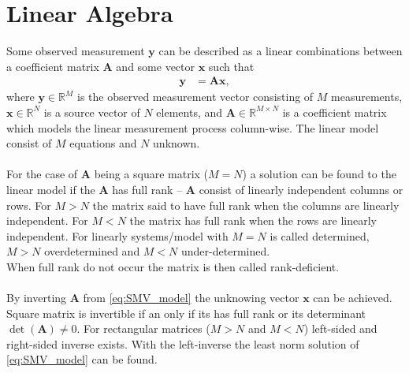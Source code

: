 \section{Linear Algebra}
Some observed measurement $\mathbf{y}$ can be described as a linear combinations between a coefficient matrix $\mathbf{A}$ and some vector $\mathbf{x}$ such that
\begin{align}\label{eq:SMV_model}
\mathbf{y} &= \mathbf{Ax},
\end{align}
where $\mathbf{y} \in \mathbb{R}^M$ is the observed measurement vector consisting of $M$ measurements, $\mathbf{x} \in \mathbb{R}^N$ is a source vector of $N$ elements, and $\mathbf{A} \in \mathbb{R}^{M \times N}$ is a coefficient matrix which models the linear measurement process column-wise. The linear model consist of $M$ equations and $N$ unknown.
\\ \\
For the case of $\mathbf{A}$ being a square matrix ($M = N$) a solution can be found to the linear model if the $\mathbf{A}$ has full rank -- $\mathbf{A}$ consist of linearly independent columns or rows. For $M > N$ the matrix said to have full rank when the columns are linearly independent. For $M < N$ the matrix has full rank when the rows are linearly independent. For linearly systems/model with $M = N$ is called determined, $M > N$ overdetermined and $M < N$ under-determined. 
\\
When full rank do not occur the matrix is then called rank-deficient.
\\ \\
By inverting $\mathbf{A}$ from \eqref{eq:SMV_model} the unknowing vector $\mathbf{x}$ can be achieved. Square matrix is invertible if an only if its has full rank or its determinant $\det(\mathbf{A}) \neq 0$. For rectangular matrices ($M > N$ and $M < N$) left-sided and right-sided inverse exists.
With the left-inverse the least norm solution of \eqref{eq:SMV_model} can be found.
\\ \\
